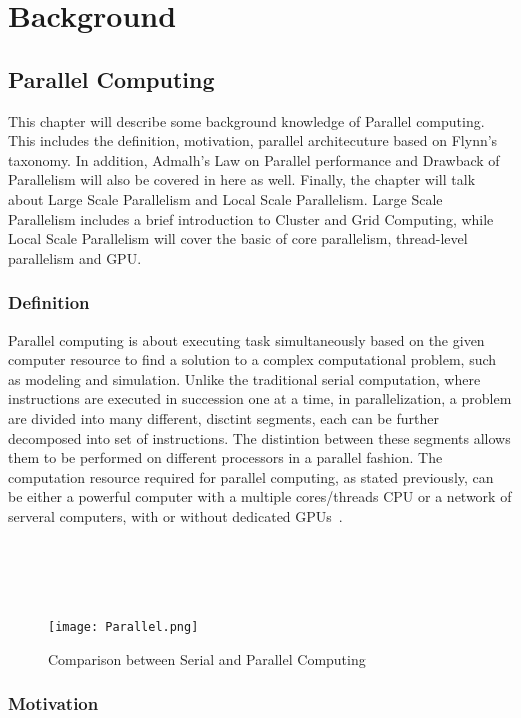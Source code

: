 \chapter{Background}

\section{Parallel Computing}

This chapter will describe some background knowledge of Parallel computing. This includes the definition, motivation, parallel architecuture based on Flynn's taxonomy. In addition, Admalh's Law on Parallel performance and Drawback of Parallelism will also be covered in here as well. Finally, the chapter will talk about Large Scale Parallelism and Local Scale Parallelism. Large Scale Parallelism includes a brief introduction to Cluster and Grid Computing, while Local Scale Parallelism will cover the basic of core parallelism, thread-level parallelism and GPU. \\

\subsection{Definition}

Parallel computing is about executing task simultaneously based on the given computer resource to find a solution to a complex computational problem, such as modeling and simulation. Unlike the traditional serial computation, where instructions are executed in succession one at a time, in parallelization, a problem are divided into many different, disctint segments, each can be further decomposed into set of instructions. The distintion between these segments allows them to be performed on different processors in a parallel fashion. The computation resource required for parallel computing, as stated previously, can be either a powerful computer with a multiple cores/threads CPU or a network of serveral computers, with or without dedicated GPUs~\cite{intro_parallel}. \\
~\\
~\\
~\\
~\\
\begin{figure}[H]
\texttt{[image: Parallel.png]}
\centering
\caption{Comparison between Serial and Parallel Computing}
\end{figure}

\subsection{Motivation}

